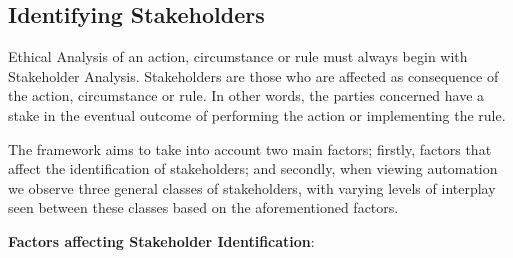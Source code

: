 \subsection{Identifying Stakeholders}
\label{sec:-identify}
Ethical Analysis of an action, circumstance or rule must always begin with Stakeholder Analysis. Stakeholders are those who are affected as consequence of the action, circumstance or rule. In other words, the parties concerned have a stake in the eventual outcome of performing the action or implementing the rule.

The framework aims to take into account two main factors; firstly, factors that affect the identification of stakeholders; and secondly, when viewing automation we observe three general classes of stakeholders, with varying levels of interplay seen between these classes based on the aforementioned factors.

\textbf{Factors affecting Stakeholder Identification}:\\

